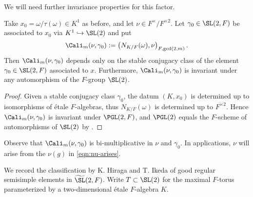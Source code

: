 \documentclass[a4paper,10pt]{article}
\begin{document}
We will need further invariance properties for this factor.
\begin{definition-proposition}\label{def:Cali-factor}
	Take $x_0 = \omega/\tau(\omega) \in K^1$ as before, and let $\nu \in F^\times/F^{\times 2}$. Let $\gamma_0 \in \SL(2,F)$ be associated to $x_0$ via $K^1 \hookrightarrow \SL(2)$ and put
	\[ \Cali_m(\nu, \gamma_0) := \left( N_{K/F}(\omega), \nu \right)_{F, \mathrm{gcd}(2,m)}. \]
	Then $\Cali_m(\nu, \gamma_0)$ depends only on the stable conjugacy class of the element $\gamma_0 \in \SL(2,F)$ associated to $x$. Furthermore, $\Cali_m(\nu, \gamma_0)$ is invariant under any automorphism of the $F$-group $\SL(2)$.
\end{definition-proposition}
\begin{proof}
	Given a stable conjugacy class $\gamma_0$, the datum $(K, x_0)$ is determined up to isomorphisms of étale $F$-algebras, thus $N_{K/F}(\omega)$ is determined up to $F^{\times 2}$. Hence $\Cali_m(\nu, \gamma_0)$ is invariant under $\PGL(2,F)$, and $\PGL(2)$ equals the $F$-scheme of automorphisms of $\SL(2)$ by \cite[Exp XXIV, Théorème 1.3]{SGA3-3}.
\end{proof}

Observe that $\Cali_m(\nu, \gamma_0)$ is bi-multiplicative in $\nu$ and $\gamma_0$. In applications, $\nu$ will arise from the $\nu(g)$ in \eqref{eqn:nu-arises}.

We record the classification by K.\! Hiraga and T.\! Ikeda of good regular semisimple elements in $\widetilde{\SL}(2,F)$. Write $T \subset \SL(2)$ for the maximal $F$-torus parameterized by a two-dimensional étale $F$-algebra $K$.
\end{document}
